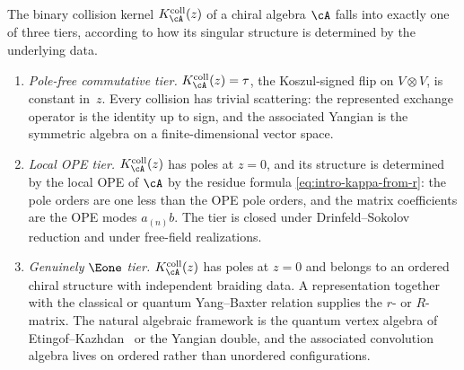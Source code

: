 \begin{definition}
\label{def:three-tier-r-matrix}
%
%
%
%
The binary collision kernel $K_\cA^{\mathrm{coll}}(z)$ of a chiral
algebra $\cA$ falls into
exactly one of three tiers, according to how its singular structure is
determined by the underlying data.
\begin{enumerate}[label=\textup{(\alph*)}]
\item \emph{Pole-free commutative tier.}
 $K_\cA^{\mathrm{coll}}(z)=\tau$, the Koszul-signed flip on
 $V\otimes V$, is constant
 in~$z$.  Every collision has trivial scattering: the
 represented exchange operator is the identity up to sign, and the associated Yangian
 is the symmetric algebra on a finite-dimensional vector space.

\item \emph{Local OPE tier.}
 $K_\cA^{\mathrm{coll}}(z)$ has poles at $z = 0$, and its structure is determined
 by the local OPE of $\cA$ by the residue formula
 \eqref{eq:intro-kappa-from-r}: the pole orders are one less than
 the OPE pole orders, and the matrix
 coefficients are the OPE modes $a_{(n)}b$. The tier
 is closed under Drinfeld--Sokolov reduction and under free-field
 realizations.

\item \emph{Genuinely $\Eone$ tier.}
 $K_\cA^{\mathrm{coll}}(z)$ has poles at $z=0$ and belongs to an
 ordered chiral structure with independent braiding data.  A
 representation together with the classical or quantum
 Yang--Baxter relation supplies the $r$- or $R$-matrix. The natural algebraic
 framework is the quantum vertex algebra of
Etingof--Kazhdan~\cite{EtingofKazhdan00} or the Yangian double,
and the associated convolution algebra lives on ordered rather
than unordered configurations.
\end{enumerate}
\end{definition}

